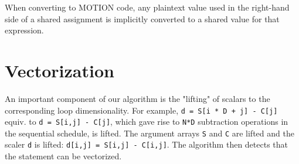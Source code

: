 \documentclass[sigconf, screen, natbib=false, dvipsnames, table]{acmart}
\theoremstyle{definition}
\begin{document}
When converting to MOTION code, any plaintext value used in the right-hand side of a shared assignment is implicitly converted to a shared value for that expression. 

\section{Vectorization}
\label{sec:vectorization}

An important component of our algorithm is the "lifting" of scalars to the corresponding loop dimensionality. 
For example, \texttt{d = S[i * D + j] - C[j]} equiv. to \texttt{d = S[i,j] - C[j]}, which gave rise to \texttt{N*D} subtraction operations in the sequential schedule, 
is lifted. The argument arrays \texttt{S} and \texttt{C} are lifted and the scaler \texttt{d} is lifted: \texttt{d[i,j] = S[i,j] - C[i,j]}.
The algorithm then detects that the statement can be vectorized. 
\end{document}
